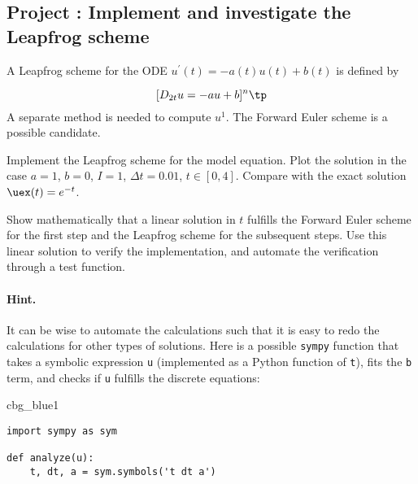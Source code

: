 \documentclass[graybox,sectrefs,envcountresetchap,open=right,final]{svmonodo}
\newenvironment{_cod_tight}[1]{
   \def\FrameCommand{\colorbox{#1}}
   \FrameRule0.6pt\MakeFramed {\FrameRestore}\vskip3mm}
   {\vskip0mm\endMakeFramed}
\newenvironment{cod}[1]{
\bgroup\rmfamily
\fboxsep=0mm\relax
\begin{_cod_tight}{#1}
\list{}{\parsep=-2mm\parskip=0mm\topsep=0pt\leftmargin=2mm
\rightmargin=2\leftmargin\leftmargin=4pt\relax}
\item\relax}
{\endlist\end{_cod_tight}\egroup}
\newenvironment{doconceexercise}{}{}
\newcounter{doconceexercisecounter}
\begin{document}
\begin{doconceexercise}

\subsection*{Project \thedoconceexercisecounter: Implement and investigate the Leapfrog scheme}

\label{decay:fd2:exer:leapfrog1}

A Leapfrog scheme
for the ODE $u^{\prime}(t) = -a(t)u(t) + b(t)$ is defined by

\begin{equation}
\lbrack D_{2t}u = -au+b\rbrack^n\tp
\label{decay:fd2:exer:leapfrog1:scheme}
\end{equation}
A separate method is needed to compute $u^1$. The Forward Euler
scheme is a possible candidate.


Implement the Leapfrog scheme for the model equation.
Plot the solution in the case $a=1$, $b=0$, $I=1$,
$\Delta t = 0.01$, $t\in [0,4]$. Compare with the exact
solution $\uex(t)=e^{-t}$.

Show mathematically that a linear solution in $t$ fulfills the
Forward Euler scheme for the first step and the Leapfrog scheme
for the subsequent steps. Use this linear solution to verify
the implementation, and automate the verification through a test
function.


\paragraph{Hint.}
It can be wise to automate the calculations such that it is easy to
redo the calculations for other types of solutions. Here is
a possible \texttt{sympy} function that takes a symbolic expression \texttt{u}
(implemented as a Python function of \texttt{t}), fits the \texttt{b} term, and
checks if \texttt{u} fulfills the discrete equations:

\begin{cod}{cbg_blue1}\begin{Verbatim}[numbers=none,fontsize=\fontsize{9pt}{9pt},baselinestretch=0.95,xleftmargin=2mm]
import sympy as sym

def analyze(u):
    t, dt, a = sym.symbols('t dt a')


\end{Verbatim}
\end{cod}
\end{doconceexercise}
\end{document}
